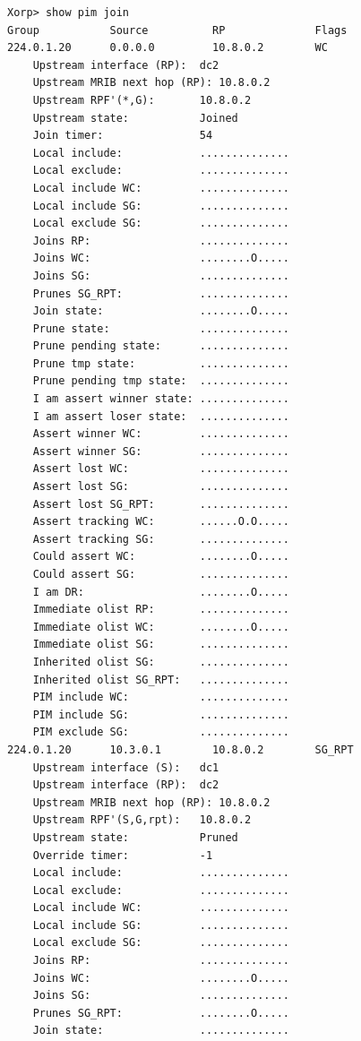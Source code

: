 \documentclass[11pt]{report}
\begin{document}
\begin{itemize}
\begin{verbatim}
Xorp> show pim join 
Group           Source          RP              Flags
224.0.1.20      0.0.0.0         10.8.0.2        WC   
    Upstream interface (RP):  dc2
    Upstream MRIB next hop (RP): 10.8.0.2
    Upstream RPF'(*,G):       10.8.0.2
    Upstream state:           Joined 
    Join timer:               54
    Local include:            ..............
    Local exclude:            ..............
    Local include WC:         ..............
    Local include SG:         ..............
    Local exclude SG:         ..............
    Joins RP:                 ..............
    Joins WC:                 ........O.....
    Joins SG:                 ..............
    Prunes SG_RPT:            ..............
    Join state:               ........O.....
    Prune state:              ..............
    Prune pending state:      ..............
    Prune tmp state:          ..............
    Prune pending tmp state:  ..............
    I am assert winner state: ..............
    I am assert loser state:  ..............
    Assert winner WC:         ..............
    Assert winner SG:         ..............
    Assert lost WC:           ..............
    Assert lost SG:           ..............
    Assert lost SG_RPT:       ..............
    Assert tracking WC:       ......O.O.....
    Assert tracking SG:       ..............
    Could assert WC:          ........O.....
    Could assert SG:          ..............
    I am DR:                  ........O.....
    Immediate olist RP:       ..............
    Immediate olist WC:       ........O.....
    Immediate olist SG:       ..............
    Inherited olist SG:       ..............
    Inherited olist SG_RPT:   ..............
    PIM include WC:           ..............
    PIM include SG:           ..............
    PIM exclude SG:           ..............
224.0.1.20      10.3.0.1        10.8.0.2        SG_RPT 
    Upstream interface (S):   dc1
    Upstream interface (RP):  dc2
    Upstream MRIB next hop (RP): 10.8.0.2
    Upstream RPF'(S,G,rpt):   10.8.0.2
    Upstream state:           Pruned 
    Override timer:           -1
    Local include:            ..............
    Local exclude:            ..............
    Local include WC:         ..............
    Local include SG:         ..............
    Local exclude SG:         ..............
    Joins RP:                 ..............
    Joins WC:                 ........O.....
    Joins SG:                 ..............
    Prunes SG_RPT:            ........O.....
    Join state:               ..............

\end{verbatim}
\end{itemize}
\end{document}
